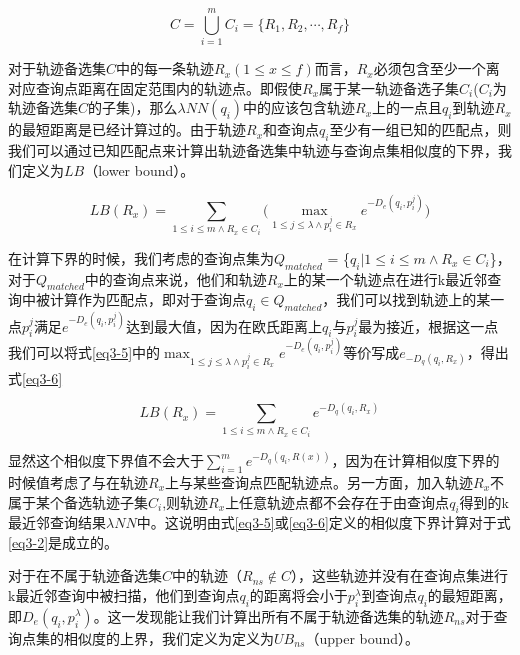 \begin{equation} 
 C = \bigcup_{i=1}^{m} C_{i} = \{R_{1}, R_{2}, \cdots, R_{f}\} \nonumber
\end{equation}  

对于轨迹备选集$C$中的每一条轨迹$R_{x} (1 \leq x \leq f)$而言，$R_{x}$必须包含至少一个离对应查询点距离在固定范围内的轨迹点。即假使$R_{x}$属于某一轨迹备选子集$C_{i}$($C_{i}$为轨迹备选集$C$的子集)，那么$\lambda NN(q_{i})$中的应该包含轨迹$R_{x}$上的一点且$q_{i}$到轨迹$R_{x}$的最短距离是已经计算过的。由于轨迹$R_{x}$和查询点$q_{i}$至少有一组已知的匹配点，则我们可以通过已知匹配点来计算出轨迹备选集中轨迹与查询点集相似度的下界，我们定义为$LB$（lower bound）。

\begin{equation}
	\label{eq3-5}
	LB(R_{x}) = \sum_{1\leq i\leq m \wedge R_{x}\in C_{i}}\bigg( \max_{1\leq j\leq \lambda \wedge p_{i}^{j}\in R_{x}}e^{-D_{e}(q_{i}, p_{i}^{j})}\bigg)
\end{equation}


在计算下界的时候，我们考虑的查询点集为$Q_{matched}$ = \{$q_{i} | 1\leq i\leq m \wedge R_{x} \in C_{i}$\}，对于$Q_{matched}$中的查询点来说，他们和轨迹$R_{x}$上的某一个轨迹点在进行k最近邻查询中被计算作为匹配点，即对于查询点$q_{i} \in Q_{matched}$，我们可以找到轨迹上的某一点$p_{i}^{j}$满足$e^{-D_{e}(q_{i}, p_{i}^{j})}$达到最大值，因为在欧氏距离上$q_{i}$与$p_{i}^{j}$最为接近，根据这一点我们可以将式\ref{eq3-5}中的$\max_{1\leq j\leq \lambda \wedge p_{i}^{j}\in R_{x}}e^{-D_{e}(q_{i}, p_{i}^{j})}$等价写成$e_{-D_{q}(q_{i}, R_{x})}$，得出式\ref{eq3-6}

\begin{equation}
	\label{eq3-6}
	LB(R_{x}) = \sum_{1\leq i\leq m \wedge R_{x}\in C_{i}}e^{-D_{q}(q_{i}, R_{x})}
\end{equation} 

显然这个相似度下界值不会大于$\sum_{i=1}^{m} e^{-D_{q}(q_{i}, R(x))}$，因为在计算相似度下界的时候值考虑了与在轨迹$R_{x}$上与某些查询点匹配轨迹点。另一方面，加入轨迹$R_{x}$不属于某个备选轨迹子集$C_{i}$,则轨迹$R_{x}$上任意轨迹点都不会存在于由查询点$q_{i}$得到的k最近邻查询结果$\lambda NN$中。这说明由式\ref{eq3-5}或\ref{eq3-6}定义的相似度下界计算对于式\ref{eq3-2}是成立的。

对于在不属于轨迹备选集$C$中的轨迹（$R_{ns} \notin C$），这些轨迹并没有在查询点集进行k最近邻查询中被扫描，他们到查询点$q_{i}$的距离将会小于$p_{i}^{\lambda}$到查询点$q_{i}$的最短距离，即$D_{e}(q_{i}, p_{i}^{\lambda})$。这一发现能让我们计算出所有不属于轨迹备选集的轨迹$R_{ns}$对于查询点集的相似度的上界，我们定义为定义为$UB_{ns}$（upper bound）。

